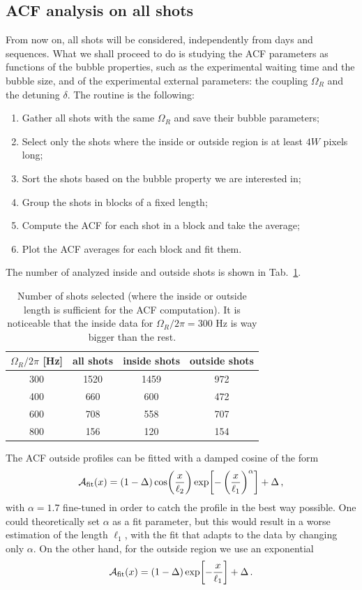 \subsection{ACF analysis on all shots}
From now on, all shots will be considered, independently from days and sequences. What we shall proceed to do is studying the ACF parameters as functions of the bubble properties, such as the experimental waiting time and the bubble size, and of the experimental external parameters: the coupling $\Omega_R$ and the detuning $\delta$. 
The routine is the following:
\begin{enumerate}
    \item Gather all shots with the same $\Omega_R$ and save their bubble parameters;
    \item Select only the shots where the inside or outside region is at least $4W$ pixels long;
    \item Sort the shots based on the bubble property we are interested in;
    \item Group the shots in blocks of a fixed length;
    \item Compute the ACF for each shot in a block and take the average;
    \item Plot the ACF averages for each block and fit them.
\end{enumerate}
The number of analyzed inside and outside shots is shown in Tab.\ \ref{tab:shots}.
\begin{table}
    \centering
    \begin{tabular}{c|c|c|c}
        $\Omega_R/2\pi$ [\unit{\hertz}] & all shots & inside shots & outside shots \\
        \hline
        300 & 1520 & 1459 & 972\\   
        400 & 660 & 600 & 472\\
        600 & 708 & 558 & 707\\
        800 & 156 & 120 & 154\\     
    \end{tabular}
    \caption{Number of shots selected (where the inside or outside length is sufficient for the ACF computation). It is noticeable that the inside data for $\Omega_R/2\pi = 300$ \unit{\hertz} is way bigger than the rest.}
    \label{tab:shots}
\end{table}
The ACF outside profiles can be fitted with a damped cosine of the form
\begin{equation*}
    \mathcal{A}_{\rm fit}(x) = (1 - \Delta)\cos(\frac{x}{\ell_2})\exp[-\left(\frac{x}{\ell_1}\right)^\alpha] + \Delta\, ,
\end{equation*}
with $\alpha = 1.7$ fine-tuned in order to catch the profile in the best way possible. One could theoretically set $\alpha$ as a fit parameter, but this would result in a worse estimation of the length $\ell_1$, with the fit that adapts to the data by changing only $\alpha$. On the other hand, for the outside region we use an exponential
\begin{equation*}
    \mathcal{A}_{\rm fit}(x) = (1-\Delta)\exp[-\frac{x}{\ell_1}] + \Delta\, .
\end{equation*}

